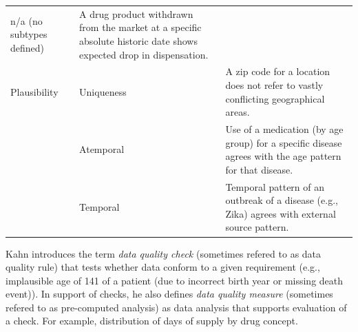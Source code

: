 \documentclass[11pt]{book}
\begin{document}
\begin{longtable}[]{@{}lll@{}}
\begin{minipage}[t]{0.16\columnwidth}
n/a (no subtypes defined)\strut
\end{minipage} & \begin{minipage}[t]{0.67\columnwidth}\raggedright\strut
A drug product withdrawn from the market at a specific absolute historic
date shows expected drop in dispensation.\strut
\end{minipage}\tabularnewline
\begin{minipage}[t]{0.09\columnwidth}\raggedright\strut
Plausibility\strut
\end{minipage} & \begin{minipage}[t]{0.16\columnwidth}\raggedright\strut
Uniqueness\strut
\end{minipage} & \begin{minipage}[t]{0.67\columnwidth}\raggedright\strut
A zip code for a location does not refer to vastly conflicting
geographical areas.\strut
\end{minipage}\tabularnewline
\begin{minipage}[t]{0.09\columnwidth}\raggedright\strut
\strut
\end{minipage} & \begin{minipage}[t]{0.16\columnwidth}\raggedright\strut
Atemporal\strut
\end{minipage} & \begin{minipage}[t]{0.67\columnwidth}\raggedright\strut
Use of a medication (by age group) for a specific disease agrees with
the age pattern for that disease.\strut
\end{minipage}\tabularnewline
\begin{minipage}[t]{0.09\columnwidth}\raggedright\strut
\strut
\end{minipage} & \begin{minipage}[t]{0.16\columnwidth}\raggedright\strut
Temporal\strut
\end{minipage} & \begin{minipage}[t]{0.67\columnwidth}\raggedright\strut
Temporal pattern of an outbreak of a disease (e.g., Zika) agrees with
external source pattern.\strut
\end{minipage}\tabularnewline
\bottomrule
\end{longtable}

Kahn introduces the term \emph{data quality check} (sometimes refered to
as data quality rule) that tests whether data conform to a given
requirement (e.g., implausible age of 141 of a patient (due to incorrect
birth year or missing death event)). In support of checks, he also
defines \emph{data quality measure} (sometimes refered to as
pre-computed analysis) as data analysis that supports evaluation of a
check. For example, distribution of days of supply by drug concept.
\end{document}
